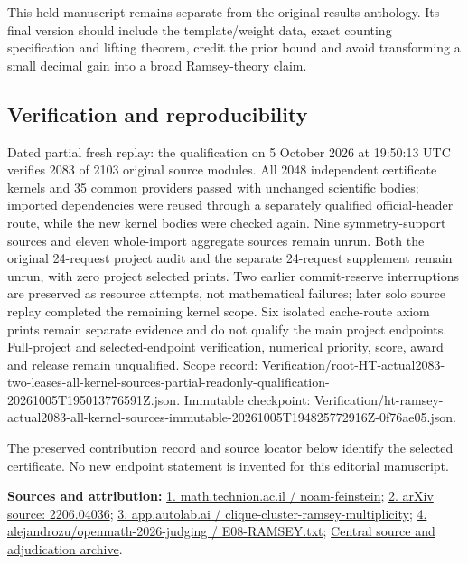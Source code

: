 \documentclass[11pt,a4paper]{article}
\begin{document}
This held manuscript remains separate from the original-results anthology. Its final version should include the template/weight data, exact counting specification and lifting theorem, credit the prior bound and avoid transforming a small decimal gain into a broad Ramsey-theory claim.

\subsection{Verification and reproducibility}
Dated partial fresh replay: the qualification on 5 October 2026 at 19:50:13 UTC verifies 2083 of 2103 original source modules. All 2048 independent certificate kernels and 35 common providers passed with unchanged scientific bodies; imported dependencies were reused through a separately qualified official-header route, while the new kernel bodies were checked again. Nine symmetry-support sources and eleven whole-import aggregate sources remain unrun. Both the original 24-request project audit and the separate 24-request supplement remain unrun, with zero project selected prints. Two earlier commit-reserve interruptions are preserved as resource attempts, not mathematical failures; later solo source replay completed the remaining kernel scope. Six isolated cache-route axiom prints remain separate evidence and do not qualify the main project endpoints. Full-project and selected-endpoint verification, numerical priority, score, award and release remain unqualified. Scope record: Verification/root-HT-actual2083-two-leases-all-kernel-sources-partial-readonly-qualification-20261005T195013776591Z.json. Immutable checkpoint: Verification/ht-ramsey-actual2083-all-kernel-sources-immutable-20261005T194825772916Z-0f76ae05.json.

The preserved contribution record and source locator below identify the selected certificate. No new endpoint statement is invented for this editorial manuscript.

{\small\textbf{Sources and attribution:} \href{https://math.technion.ac.il/events/noam-feinstein/}{1. math.technion.ac.il / noam-feinstein}; \href{https://arxiv.org/pdf/2206.04036}{2. arXiv source: 2206.04036}; \href{https://app.autolab.ai/hills/alejandrozu/clique-cluster-ramsey-multiplicity}{3. app.autolab.ai / clique-cluster-ramsey-multiplicity}; \href{https://github.com/alejandrozu/openmath-2026-judging/blob/d0ed487f487fa7ec814ff705ab55249983fe8707/OpenMath-Judging/review/entries/E08-RAMSEY.txt}{4. alejandrozu/openmath-2026-judging / E08-RAMSEY.txt}; \href{https://github.com/alejandrozu/openmath-2026-judging}{Central source and adjudication archive}.\par}
\end{document}
